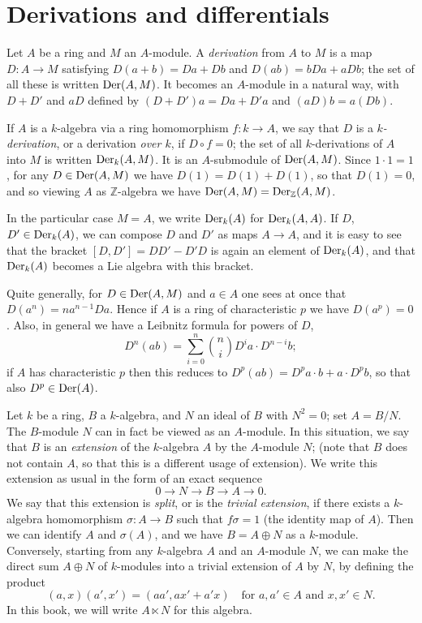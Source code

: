 \section{Derivations and differentials}\label{sec:25}

Let $A$ be a ring and $M$ an $A$-module. A \emph{derivation} from $A$ to $M$ is a map
$D\colon A \to M$ satisfying $D(a + b) = Da + Db$ and $D(ab) = bDa + aDb$; the set of all
these is written $\operatorname{Der}(A, M)$. It becomes an $A$-module in a natural way, with
$D + D'$ and $aD$ defined by $(D + D')a = Da + D'a$ and $(aD)b = a(Db)$.

If $A$ is a $k$-algebra via a ring homomorphism $f\colon k \to A$, we say that $D$ is
a \emph{$k$-derivation}, or a derivation \emph{over $k$}, if $D \circ f = 0$; the set of all
$k$-derivations of $A$ into $M$ is written $\operatorname{Der}_k(A, M)$. It is an $A$-submodule of
$\operatorname{Der}(A, M)$. Since $1 \cdot 1 = 1$, for any $D \in \operatorname{Der}(A, M)$ we have
$D(1) = D(1) + D(1)$, so that $D(1) = 0$, and so viewing $A$ as $\mathbb{Z}$-algebra we have
$\operatorname{Der}(A, M) = \operatorname{Der}_{\mathbb{Z}}(A, M)$.

In the particular case $M = A$, we write $\operatorname{Der}_k(A)$ for $\operatorname{Der}_k(A, A)$. If $D$,
$D' \in \operatorname{Der}_k(A)$, we can compose $D$ and $D'$ as maps $A \to A$, and it is easy to see
that the bracket $[D, D'] = DD' - D'D$ is again an element of $\operatorname{Der}_k(A)$, and that
$\operatorname{Der}_k(A)$ becomes a Lie algebra with this bracket.

Quite generally, for $D \in \operatorname{Der}(A, M)$ and $a \in A$ one sees at once that
$D(a^n) = na^{n-1}Da$. Hence if $A$ is a ring of characteristic $p$ we have
$D(a^p) = 0$. Also, in general we have a Leibnitz formula for powers of $D$,
\[
  D^n(ab) = \sum_{i=0}^n \binom{n}{i} D^i a \cdot D^{n-i} b;
\]
if $A$ has characteristic $p$ then this reduces to $D^p(ab) = D^pa \cdot b + a \cdot
D^pb$, so that also $D^p \in \operatorname{Der}(A)$.

Let $k$ be a ring, $B$ a $k$-algebra, and $N$ an ideal of $B$ with $N^2 = 0$; set
$A = B/N$. The $B$-module $N$ can in fact be viewed as an $A$-module. In this
situation, we say that $B$ is an \emph{extension} of the $k$-algebra $A$ by the $A$-module
$N$; (note that $B$ does not contain $A$, so that this is a different usage of
extension). We write this extension as usual in the form of an exact sequence
\[
  0 \to N \to B \to A \to 0.
\]
We say that this extension is \emph{split}, or is the \emph{trivial extension}, if there exists
a $k$-algebra homomorphism $\sigma\colon A \to B$ such that $f\sigma = 1$ (the identity map
of $A$). Then we can identify $A$ and $\sigma(A)$, and we have $B = A \oplus N$ as a
$k$-module. Conversely, starting from any $k$-algebra $A$ and an $A$-module $N$, we
can make the direct sum $A \oplus N$ of $k$-modules into a trivial extension of $A$
by $N$, by defining the product
\[
  (a, x)(a', x') = (aa', ax' + a'x) \quad \text{for } a, a' \in A \text{ and } x, x' \in N.
\]
In this book, we will write $A \ltimes N$ for this algebra.

